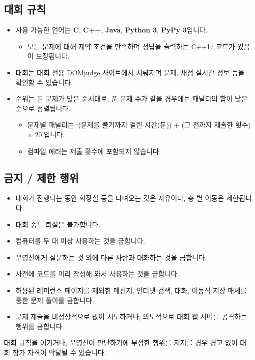 \subsection*{대회 규칙}
\begin{itemize}
    \item 사용 가능한 언어는 \textbf{C}, \textbf{C++}, \textbf{Java}, \textbf{Python 3}, \textbf{PyPy 3}입니다.
    \begin{itemize}
        \item 모든 문제에 대해 제약 조건을 만족하며 정답을 출력하는 C++17 코드가 있음이 보장됩니다.
    \end{itemize}
    \item 대회는 대회 전용 DOMjudge 사이트에서 치뤄지며 문제, 채점 실시간 정보 등을 확인할 수 있습니다.
    \item 순위는 푼 문제가 많은 순서대로, 푼 문제 수가 같을 경우에는 패널티의 합이 낮은 순으로 정렬됩니다.
    \begin{itemize}
        \item 문제별 패널티는 `(문제를 풀기까지 걸린 시간(분)) + (그 전까지 제출한 횟수) $ \times $ 20'입니다.
        \item 컴파일 에러는 제출 횟수에 포함되지 않습니다.
    \end{itemize}
\end{itemize}
\subsection*{금지 / 제한 행위}
\begin{itemize}
    \item 대회가 진행되는 동안 화장실 등을 다녀오는 것은 자유이나, 층 별 이동은 제한됩니다.
    \item 대회 중도 퇴실은 불가합니다.
    \item 컴퓨터를 두 대 이상 사용하는 것을 금합니다.
    \item 운영진에게 질문하는 것 외에 다른 사람과 대화하는 것을 금합니다.
    \item 사전에 코드를 미리 작성해 와서 사용하는 것을 금합니다.
    \item 허용된 레퍼런스 페이지를 제외한 메신저, 인터넷 검색, 대화, 이동식 저장 매체를 통한 문제 풀이를 금합니다.
    \item 문제 제출을 비정상적으로 많이 시도하거나, 의도적으로 대회 웹 서버를 공격하는 행위를 금합니다.
\end{itemize}
대회 규칙을 어기거나, 운영진이 판단하기에 부정한 행위를 저지를 경우 경고 없이 대회 참가 자격이 박탈될 수 있습니다.
